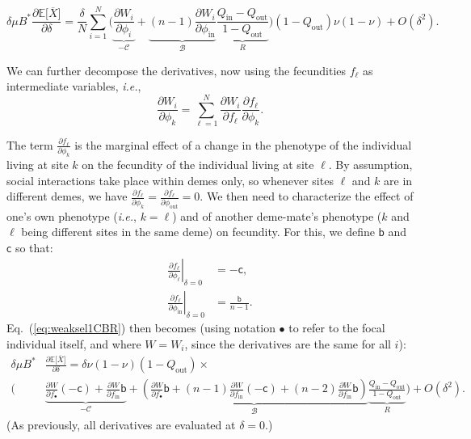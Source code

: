 \documentclass[11pt, letterpaper]{article}
\newcommand{\Eqref}[1]{Eq.~(\ref{#1})}
\newcommand{\ie}{\textit{i.e.}}
\newcommand{\deriv}[2]{\partial_{#2}\!{#1}\,}
\newcommand{\derivv}[3]{\left.\frac{\partial #1}{\partial #2}\right |_{#3=0}} %
\newcommand{\derivn}[2]{\frac{\partial #1}{\partial #2}}
\newcommand{\Esp}[1]{\mathbb{E}\big[ #1\big]}%
\newcommand{\bigO}[1]{O\left( #1 \right)}
\newcommand{\bb}{\mathsf{b}}
\newcommand{\cc}{\mathsf{c}}
\newcommand{\mutbias}{\nu}
\newcommand{\inn}{\textrm{in}}
\newcommand{\out}{\textrm{out}}
\newcommand{\focal}{\bullet}
\newcommand{\selstr}{\delta}
\begin{document}
%
\begin{equation}\label{eq:weaksel1CBR}
\selstr \mu B^* \derivn{\Esp{\overline{X}}}{\selstr} = \frac{\selstr}{N} \sum_{i=1}^N \Bigg( \underbrace{\derivn{W_i}{\phi_i}}_{-\mathcal{C}} + \underbrace{(n-1) \derivn{W_i}{\phi_{\inn}}}_{\mathcal{B}} \underbrace{\frac{Q_{\inn} - Q_{\out}}{1 - Q_{\out}}}_{R} \Bigg) (1 - Q_{\out}) \mutbias (1-\mutbias) + \bigO{\selstr^2}.
\end{equation}
%

We can further decompose the derivatives, now using the fecundities $f_{\ell}$ as intermediate variables, \ie,
\begin{equation}
\derivn{W_i}{\phi_k} = \sum_{\ell =1}^N \derivn{W_i}{f_{\ell}} \derivn{f_{\ell}}{\phi_k}.
\end{equation}

The term $\derivn{f_{\ell}}{\phi_k}$ is the marginal effect of a change in the phenotype of the individual living at site $k$ on the fecundity of the individual living at site $\ell$. By assumption, social interactions take place within demes only, so whenever sites $\ell$ and $k$ are in different demes, we have $\derivn{f_{\ell}}{\phi_k} = \derivn{f_{\ell}}{\phi_{\out}}=0$. We then need to characterize the effect of one's own phenotype (\ie, $k=\ell$) and of another deme-mate's phenotype ($k$ and $\ell$ being different sites in the same deme) on fecundity. For this, we define $\bb$ and $\cc$ so that:
%
\begin{subequations}\label{eq:derivf}
\begin{align}
\derivv{f_{\ell}}{\phi_{\ell}}{\selstr} & = -\cc,\\
\derivv{f_{\ell}}{\phi_{\inn}}{\selstr} & = \frac{\bb}{n-1}.\end{align}
\end{subequations}
%
\Eqref{eq:weaksel1CBR} then becomes (using notation $\focal$ to refer to the focal individual itself, and where $W=W_i$, since the derivatives are the same for all $i$):
%
\begin{equation}\label{eq:weaksel2}
\begin{split}
\selstr \mu B^* & \derivn{\Esp{\overline{X}}}{\selstr} = \selstr  \mutbias (1-\mutbias) (1 - Q_{\out}) \times \\
 \Bigg( &\underbrace{ \derivn{W}{f_{\focal}} (-\cc) + \derivn{W}{f_{\inn}} \bb}_{-\mathcal{C}} + \underbrace{ \left( \derivn{W}{f_{\focal}} \bb + (n-1) \derivn{W}{f_{\inn}} (-\cc) + (n-2) \derivn{W}{f_{\inn}} \bb \right) }_{\mathcal{B}} \underbrace{\frac{Q_{\inn} - Q_{\out}}{1 - Q_{\out}}}_{R} \Bigg)  + \bigO{\selstr^2}.
\end{split}
\end{equation}
%
(As previously, all derivatives are evaluated at $\selstr = 0$.)
\end{document}
